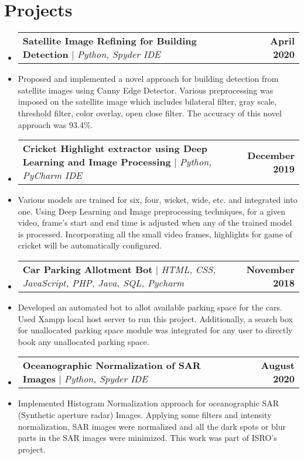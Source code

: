 \documentclass[letterpaper,11pt]{article}
\makeatletter
\newcommand{\resumeProjectHeading}[2]{
    \item
    \begin{tabular*}{1.001\textwidth}{l@{\extracolsep{\fill}}r}
      \small#1 & \textbf{\small #2}\\
    \end{tabular*}\vspace{-7pt}
}
\newcommand{\resumeSubHeadingListStart}{\begin{itemize}[leftmargin=0.0in, label={}]}
\newcommand{\resumeSubHeadingListEnd}{\end{itemize}}
\makeatother
\begin{document}
\section{Projects}
    \vspace{-5pt}
    \resumeSubHeadingListStart
      \resumeProjectHeading
          {\textbf{Satellite Image Refining for Building Detection} $|$ \emph{Python, Spyder IDE}}{April 2020}
          \item{Proposed and implemented a novel approach for building detection from satellite images using Canny Edge Detector. Various preprocessing was imposed on the satellite image which includes bilateral filter, gray scale, threshold filter, color overlay, open close filter. The accuracy of this novel approach was 93.4\%.}
          \vspace{-18pt}
          \resumeProjectHeading
          {\textbf{Cricket Highlight extractor using Deep Learning and Image Processing} $|$ \emph{Python, PyCharm IDE}}{December 2019}
          \item{Various models are trained for six, four, wicket, wide, etc. and integrated into one. Using Deep Learning and Image preprocessing techniques, for a given video, frame's start and end time is adjusted when any of the trained model is processed. Incorporating all the small video frames, highlights for game of cricket will be automatically configured.}
          \vspace{-18pt}
          \resumeProjectHeading
          {\textbf{Car Parking Allotment Bot} $|$ \emph{HTML, CSS, JavaScript, PHP, Java,  SQL, Pycharm}}{November 2018}
          \item{
          Developed an automated bot to allot available parking space for the cars. Used Xampp local host server to run this project. Additionally, a search box for unallocated parking space module was integrated for any user to directly book any unallocated parking space.    
          }
          \vspace{-18pt}
          \resumeProjectHeading
          {\textbf{Oceanographic Normalization of SAR Images} $|$ \emph{Python, Spyder IDE}}{August 2020}
          \item{Implemented Histogram Normalization approach for oceanographic SAR (Synthetic aperture radar) Images. Applying some filters and intensity normalization, SAR images were normalized and all the dark spots or blur parts in the SAR images were minimized. This work was part of ISRO's project.} 
    \resumeSubHeadingListEnd
\vspace{-18pt}
\end{document}

